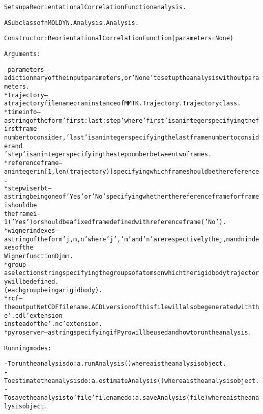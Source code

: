 \begin{alltt}
Sets up a Reorientational Correlation Function analysis.

A Subclass of nMOLDYN.Analysis.Analysis. 

Constructor: ReorientationalCorrelationFunction({\textbar}parameters{\textbar} = None)

Arguments:

    - {\textbar}parameters{\textbar} -- a dictionnary of the input parameters, or 'None' to set up the analysis without parameters.
        * trajectory     -- a trajectory file name or an instance of MMTK.Trajectory.Trajectory class.
        * timeinfo       -- a string of the form 'first:last:step' where 'first' is an integer specifying the first frame 
                            number to consider, 'last' is an integer specifying the last frame number to consider and 
                            'step' is an integer specifying the step number between two frames.
        * referenceframe -- an integer in [1,len(trajectory)] specifying which frame should be the reference.
        * stepwiserbt    -- a string being one of 'Yes' or 'No' specifying whether the reference frame for frame i should be 
                            the frame i - 1 ('Yes') or should be a fixed frame defined with {\textbar}referenceframe{\textbar} ('No').
        * wignerindexes  -- a string of the form 'j,m,n' where 'j', 'm' and 'n' are respectively the j, m and n indexes of the
                            Wigner function Djmn.
        * group          -- a selection string specifying the groups of atoms on which the rigid body trajectory will be defined.
                            (each group being a rigid body).
        * rcf            -- the output NetCDF file name. A CDL version of this file will also be generated with the '.cdl' extension
                             instead of the '.nc' extension.
        * pyroserver     -- a string specifying if Pyro will be used and how to run the analysis.
    
Running modes:

    - To run the analysis do: a.runAnalysis() where a is the analysis object.
    - To estimate the analysis do: a.estimateAnalysis() where a is the analysis object.
    - To save the analysis to 'file' file name do: a.saveAnalysis(file) where a is the analysis object.
\end{alltt}



